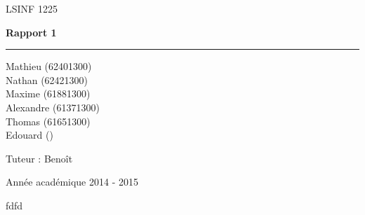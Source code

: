 \documentclass[10pt, a4, oneside, headings=normal]{scrreprt}
\begin{document}
\begin{titlepage}

\selectfont
\begin{center}
LSINF 1225
\end{center}
\begin{center}\huge\bfseries
Rapport 1
\end{center}
\hrule

\begin{center}\large
\end{center}
\begin{center}\large
\end{center}
\begin{center}\large
\end{center}
\begin{center}\large
\end{center}
\begin{center}\large
\end{center}
\begin{center}\large
\end{center}
\begin{center}\large
\end{center}



\begin{center}\large
\end{center}

\begin{center}\large
Mathieu  (62401300) \\ Nathan  (62421300) \\ Maxime  (61881300) \\ Alexandre  (61371300)\\ Thomas  (61651300) \\ Edouard  ()
\end{center}

\begin{center}\large
\end{center}

\begin{center}\large
Tuteur : Benoît 
\end{center}

\begin{center}
Ann\'ee acad\'emique 2014 - 2015
\end{center}
\end{titlepage}



\tableofcontents
fdfd
\end{document}
